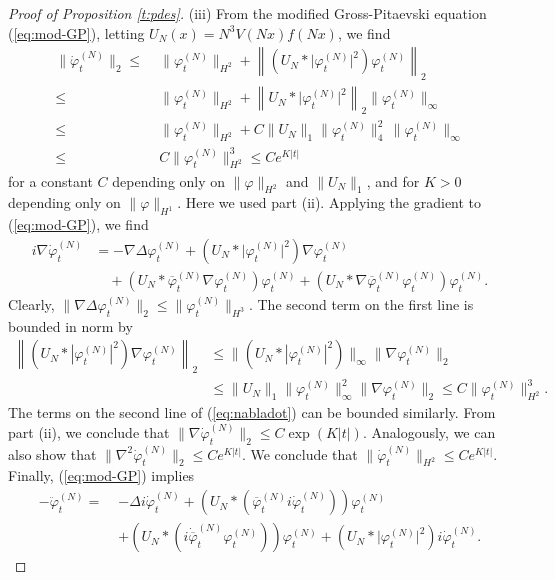 \documentclass[11pt,a4paper]{article}
\newcommand{\norm}[1]{\lVert#1\rVert}	%
\newcommand{\ph}{\varphi_t^{(N)}}	%
\newcommand{\phdot}{\dot{\varphi}_t^{(N)}}	%
\newcommand{\phddot}{\ddot{\varphi}_t^{(N)}}	%
\begin{document}
\begin{proof}[Proof of Proposition \ref{t:pdes}]
(iii) {F}rom the modified Gross-Pitaevski equation (\ref{eq:mod-GP}), letting $U_N (x) = N^3 V(Nx) f(Nx)$, we find
\[ \begin{split}
\norm{\phdot}_{2} \leq \; & \norm{\ph}_{H^2} + \left\| \left(U_N * \lvert \ph\rvert^2 \right)\ph \right\|_2 \\  \leq \; & \norm{\ph}_{H^2} + \left\| U_N * \lvert \ph\rvert^2 \right\|_2 \| \ph \|_\infty \\ \leq \; &
 \norm{\ph}_{H^2} + C \| U_N \|_1 \| \ph \|_4^2 \, \| \ph \|_\infty \\ \leq \;  &C \| \ph \|_{H^2}^3 \leq C e^{K |t|} 
\end{split} \]
for a constant $C$ depending only on $\| \varphi \|_{H^2}$ and $\| U_N \|_1$, and for $K >0$ depending only on $\| \varphi \|_{H^1}$. Here we used part (ii). Applying the gradient to (\ref{eq:mod-GP}), we find 
\begin{equation}\label{eq:nabladot} \begin{split}
i \nabla \phdot & = - \nabla \Delta \ph + \left( U_N \ast \lvert \ph \rvert^2 \right) \nabla \ph \\
& \quad + \left( U_N \ast \overline{\varphi}_t^{(N)} \nabla \ph \right) \ph + \left( U_N \ast  \nabla \overline{\varphi}_t^{(N)} \ph \right) \ph. 
\end{split} \end{equation}
Clearly, $\norm{\nabla \Delta \ph}_{2} \leq \norm{\ph}_{H^3}$. The second term on the first line is bounded in norm by
\[\begin{split}  \left\| (U_N * |\varphi_t^{(N)}|^2) \nabla \ph \right\|_2 &
\leq \| (U_N * |\varphi_t^{(N)}|^2)  \|_{\infty}   \| \nabla \ph \|_2 \\
&\leq  \|U_N\|_1 \|\varphi_t^{(N)}\|_\infty^2    \| \nabla \ph \|_2 \leq C
\| \ph \|_{H^2}^3. \end{split} \]
The terms on the second line of (\ref{eq:nabladot}) can be bounded similarly. {F}rom part (ii), we conclude that $\| \nabla \dot{\varphi}_t^{(N)} \|_2 \leq C \exp (K |t|)$. Analogously, we can also show that $\| \nabla^2 \dot{\varphi}_t^{(N)} \|_2 \leq C e^{K |t|}$. We conclude that $\| \dot{\varphi}^{(N)}_t\|_{H^2} \leq C e^{K |t|}$. Finally, (\ref{eq:mod-GP}) implies 
\[ \begin{split}
-\phddot  = \; &-\Delta i \phdot + \left( U_N \ast (\overline{\varphi}_t^{(N)} i \phdot)\right) \ph \\
&+ \left( U_N \ast (i\dot{\overline{\varphi}}_t^{(N)} \ph) \right) \ph + \left( U_N \ast \lvert\ph\rvert^2 \right) i \phdot.

\end{split}\]
\end{proof}
\end{document}
